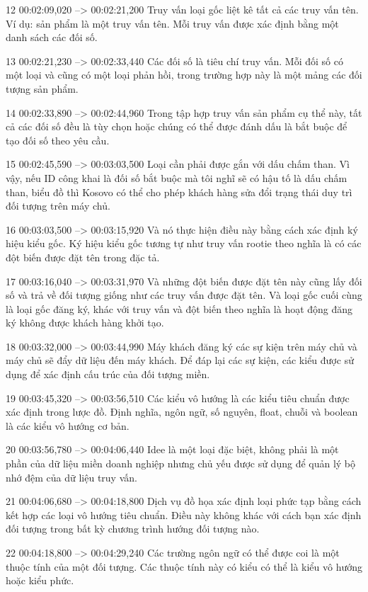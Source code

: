 12
00:02:09,020 --> 00:02:21,200
Truy vấn loại gốc liệt kê tất cả các truy vấn tên.  Ví dụ: sản phẩm là một truy vấn tên.  Mỗi truy vấn được xác định bằng một danh sách các đối số.

13
00:02:21,230 --> 00:02:33,440
Các đối số là tiêu chí truy vấn.  Mỗi đối số có một loại và cũng có một loại phản hồi, trong trường hợp này là một mảng các đối tượng sản phẩm.

14
00:02:33,890 --> 00:02:44,960
Trong tập hợp truy vấn sản phẩm cụ thể này, tất cả các đối số đều là tùy chọn hoặc chúng có thể được đánh dấu là bắt buộc để tạo đối số theo yêu cầu.

15
00:02:45,590 --> 00:03:03,500
Loại cần phải được gắn với dấu chấm than.  Vì vậy, nếu ID công khai là đối số bắt buộc mà tôi nghĩ sẽ có hậu tố là dấu chấm than, biểu đồ thì Kosovo có thể cho phép khách hàng sửa đổi trạng thái duy trì đối tượng trên máy chủ.

16
00:03:03,500 --> 00:03:15,920
Và nó thực hiện điều này bằng cách xác định ký hiệu kiểu gốc.  Ký hiệu kiểu gốc tương tự như truy vấn rootie theo nghĩa là có các đột biến được đặt tên trong đặc tả.

17
00:03:16,040 --> 00:03:31,970
Và những đột biến được đặt tên này cũng lấy đối số và trả về đối tượng giống như các truy vấn được đặt tên.  Và loại gốc cuối cùng là loại gốc đăng ký, khác với truy vấn và đột biến theo nghĩa là hoạt động đăng ký không được khách hàng khởi tạo.

18
00:03:32,000 --> 00:03:44,990
Máy khách đăng ký các sự kiện trên máy chủ và máy chủ sẽ đẩy dữ liệu đến máy khách.  Để đáp lại các sự kiện, các kiểu được sử dụng để xác định cấu trúc của đối tượng miền.

19
00:03:45,320 --> 00:03:56,510
Các kiểu vô hướng là các kiểu tiêu chuẩn được xác định trong lược đồ.  Định nghĩa, ngôn ngữ, số nguyên, float, chuỗi và boolean là các kiểu vô hướng cơ bản.

20
00:03:56,780 --> 00:04:06,440
Idee là một loại đặc biệt, không phải là một phần của dữ liệu miền doanh nghiệp nhưng chủ yếu được sử dụng để quản lý bộ nhớ đệm của dữ liệu truy vấn.

21
00:04:06,680 --> 00:04:18,800
Dịch vụ đồ họa xác định loại phức tạp bằng cách kết hợp các loại vô hướng tiêu chuẩn.  Điều này không khác với cách bạn xác định đối tượng trong bất kỳ chương trình hướng đối tượng nào.

22
00:04:18,800 --> 00:04:29,240
Các trường ngôn ngữ có thể được coi là một thuộc tính của một đối tượng.  Các thuộc tính này có kiểu có thể là kiểu vô hướng hoặc kiểu phức.

